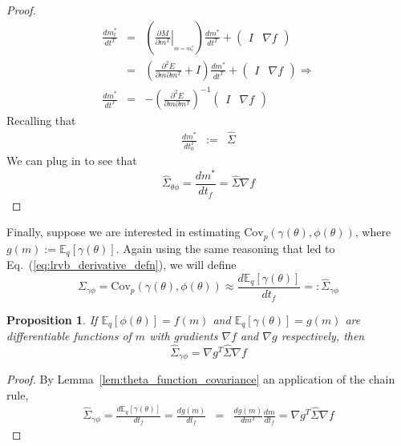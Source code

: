 \documentclass{article}\usepackage[]{graphicx}\usepackage[]{color}
\newcommand{\lem}[1]{Lemma~\ref{lem:#1}}
\newcommand{\eq}[1]{Eq.~(\ref{eq:#1})}
\newcommand{\truecov}{\Sigma} %
\newcommand{\lrcov}{\hat{\Sigma}} %
\theoremstyle{plain}
\newtheorem{proposition}[theorem]{Proposition}
\newcommand{\mbeq}{\mathbb{E}_{q}}
\newcommand{\cov}{\textrm{Cov}}
\begin{document}
\begin{proof}
\begin{eqnarray*}
  \frac{dm_{t}^{*}}{dt^{T}} & = &
    \left(\left.\frac{\partial M}{\partial m^{T}}\right|_{_{m=m_{t}^{*}}}\right)
    \frac{dm^{*}}{dt^{T}}+\left(\begin{array}{cc}
  I & \nabla f\end{array}\right)\\
   & = & \left(\frac{\partial^{2}E}{\partial m\partial m^{T}}+
    I\right)\frac{dm^{*}}{dt^{T}}+\left(\begin{array}{cc}
  I & \nabla f\end{array}\right) \Rightarrow \\
  \frac{dm^{*}}{dt^{T}} & = &
    -\left(\frac{\partial^{2}E}{\partial m\partial m^{T}}\right)^{-1}
    \left(\begin{array}{cc}I & \nabla f\end{array}\right)
  \end{eqnarray*}
  Recalling that
  \begin{eqnarray*}
  \frac{dm^{*}}{dt_{0}^{T}} & := & \lrcov
  \end{eqnarray*}
  We can plug in to see that
  \begin{equation}
  \lrcov_{\theta\phi} = \frac{dm^{*}}{dt_{f}} = \lrcov \nabla f
  \end{equation}
\end{proof}
%
Finally, suppose we are interested in estimating $\cov_p(\gamma(\theta),
\phi(\theta))$, where $g(m) := \mbeq\left[\gamma(\theta)\right]$.  Again using
the same reasoning that led to \eq{lrvb_derivative_defn}, we will define
%
\begin{equation*}
\truecov_{\gamma\phi} = \cov_p(\gamma(\theta), \phi(\theta))
\approx \frac{d \mbeq\left[\gamma(\theta)\right]}{dt_f} =: \lrcov_{\gamma\phi}
\end{equation*}
%
\begin{proposition} \label{prop:function_function_covariance}
  If $\mbeq\left[\phi(\theta)\right] = f(m)$ and
  $\mbeq\left[\gamma(\theta)\right] = g(m)$ are differentiable functions of $m$
  with gradients $\nabla f$ and $\nabla g$ respectively, then
  $$
    \lrcov_{\gamma\phi} = \nabla g^{T}\lrcov \nabla f
  $$
\end{proposition}
%
\begin{proof}
  By \lem{theta_function_covariance} an application of the chain rule,
  \begin{eqnarray*}
  \lrcov_{\gamma\phi} =
  \frac{d \mbeq\left[\gamma(\theta)\right]}{dt_f} =
  \frac{d g\left(m\right)}{dt_f} & = & \frac{dg(m)}{dm^{T}}\frac{dm}{dt_{f}}
    =  \nabla g^{T}\lrcov \nabla f
  \end{eqnarray*}
\end{proof}
\end{document}

